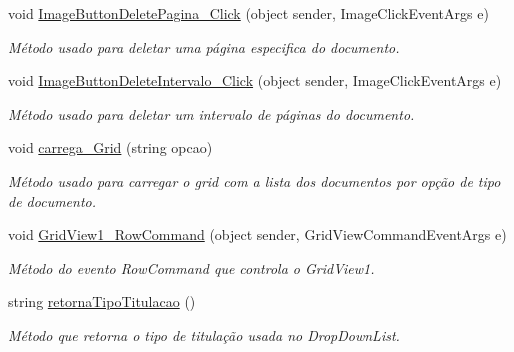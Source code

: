 \begin{DoxyCompactItemize}
void \hyperlink{class_sistema_r_h_1_1tab__default_a21082e20d4c73b3290ee755f2359e801}{ImageButtonDeletePagina\_\-Click} (object sender, ImageClickEventArgs e)
\begin{DoxyCompactList}\small\item\em Método usado para deletar uma página especifica do documento. \item\end{DoxyCompactList}\item 
void \hyperlink{class_sistema_r_h_1_1tab__default_a7120662ca3ff42c83429a1ecb0302c37}{ImageButtonDeleteIntervalo\_\-Click} (object sender, ImageClickEventArgs e)
\begin{DoxyCompactList}\small\item\em Método usado para deletar um intervalo de páginas do documento. \item\end{DoxyCompactList}\item 
void \hyperlink{class_sistema_r_h_1_1tab__default_a4a1a1b10e339e1ddd8a24dab9994a989}{carrega\_\-Grid} (string opcao)
\begin{DoxyCompactList}\small\item\em Método usado para carregar o grid com a lista dos documentos por opção de tipo de documento. \item\end{DoxyCompactList}\item 
void \hyperlink{class_sistema_r_h_1_1tab__default_af277cfa0a7ea2cfba2d170950380e555}{GridView1\_\-RowCommand} (object sender, GridViewCommandEventArgs e)
\begin{DoxyCompactList}\small\item\em Método do evento RowCommand que controla o GridView1. \item\end{DoxyCompactList}\item 
string \hyperlink{class_sistema_r_h_1_1tab__default_a826d27e70679bf581ad1fba079588776}{retornaTipoTitulacao} ()
\begin{DoxyCompactList}\small\item\em Método que retorna o tipo de titulação usada no DropDownList. \item\end{DoxyCompactList}\end{DoxyCompactItemize}
